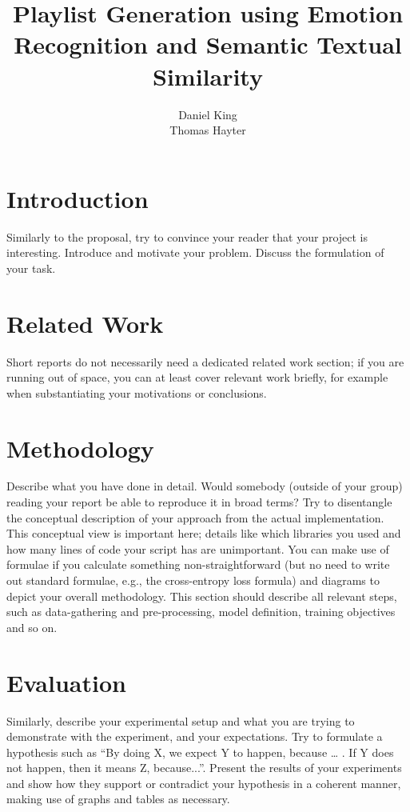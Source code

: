 \documentclass[11pt]{article}
\title{Playlist Generation using Emotion Recognition and Semantic Textual Similarity}
\author{
    Daniel King \\
    \And
    Thomas Hayter \\
}
\begin{document}
\maketitle


\section{Introduction}

Similarly to the proposal, try to convince your reader that your project is interesting. Introduce and motivate your problem. Discuss the formulation of your task.

\section{Related Work}
Short reports do not necessarily need a dedicated related work section; if you are running out of space, you can at least cover relevant work briefly, for example when substantiating your motivations or conclusions.


\section{Methodology}
Describe what you have done in detail. Would somebody (outside of your group) reading your report be able to reproduce it in broad terms? Try to disentangle the conceptual description of your approach from the actual implementation. This conceptual view is important here; details like which libraries you used and how many lines of code your script has are unimportant. You can make use of formulae if you calculate something non-straightforward (but no need to write out standard formulae, e.g., the cross-entropy loss formula) and diagrams to depict your overall methodology. This section should describe all relevant steps, such as data-gathering and pre-processing, model definition, training objectives and so on.



\section{Evaluation}
Similarly, describe your experimental setup and what you are trying to demonstrate with the experiment, and your expectations. Try to formulate a hypothesis such as ``By doing X, we expect Y to happen, because … . If Y does not happen, then it means Z, because...''. Present the results of your experiments and show how they support or contradict your hypothesis in a coherent manner, making use of graphs and tables as necessary. 
\end{document}
